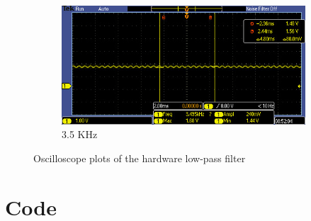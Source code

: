 \documentclass[12pt]{article}
\begin{document}
\begin{figure}[H]
\begin{subfigure}[b]{0.45\textwidth}
  \end{subfigure}
  \begin{subfigure}[b]{0.45\textwidth}
    \includegraphics[width=\textwidth]{./img/TEK00008}
    \caption{3.5 KHz}
    \label{fig:dig_4000}
  \end{subfigure}
  \label{fig:oscope-plots}
  \caption{Oscilloscope plots of the hardware low-pass filter}
\end{figure}

\newpage
\section{Code}






\end{document}
